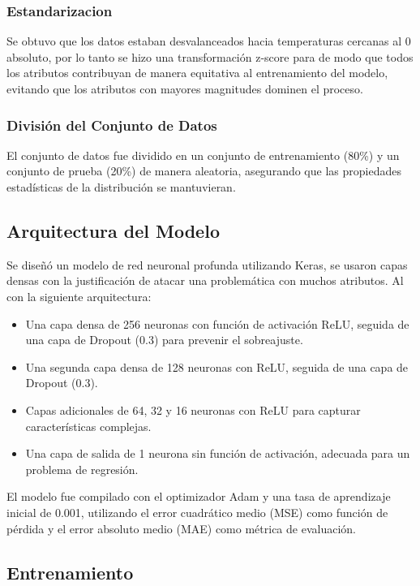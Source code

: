 \documentclass[conference]{IEEEtran} %
\begin{document}
\subsubsection{Estandarizacion}
Se obtuvo que los datos estaban desvalanceados hacia temperaturas 
cercanas al 0 absoluto, por lo tanto se hizo una transformación 
z-score para de modo que todos los atributos contribuyan de manera 
equitativa al entrenamiento del modelo, evitando que los atributos 
con mayores magnitudes dominen el proceso.

\subsubsection{División del Conjunto de Datos}
El conjunto de datos fue dividido 
en un conjunto de entrenamiento (80\%) y un conjunto de prueba 
(20\%) de manera aleatoria, asegurando que las propiedades 
estadísticas de la distribución se mantuvieran.

\subsection{Arquitectura del Modelo}

Se diseñó un modelo de red neuronal profunda utilizando Keras, se usaron 
capas densas con la justificación de atacar una problemática con muchos 
atributos. Al con 
la siguiente arquitectura:
\begin{itemize}
    \item Una capa densa de 256 neuronas con función de activación ReLU, 
    seguida de una capa de Dropout (0.3) para prevenir el sobreajuste.
    \item Una segunda capa densa de 128 neuronas con ReLU, seguida de una 
    capa de Dropout (0.3).
    \item Capas adicionales de 64, 32 y 16 neuronas con ReLU para capturar
    características complejas.
    \item Una capa de salida de 1 neurona sin función de activación, adecuada 
    para un problema de regresión.
\end{itemize}

El modelo fue compilado con el optimizador Adam y una tasa de 
aprendizaje inicial de 0.001, utilizando el error cuadrático medio 
(MSE) como función de pérdida y el error absoluto medio (MAE) como 
métrica de evaluación.

\subsection{Entrenamiento}
\end{document}
